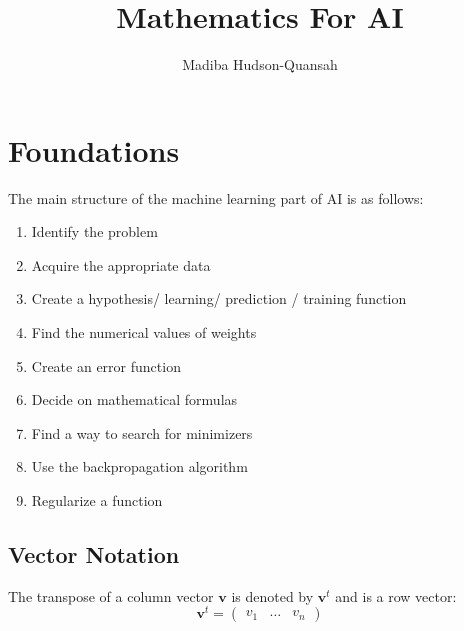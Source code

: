 \documentclass[12pt letter]{report}
\title{\Huge{Mathematics For AI}}
\author{\huge{Madiba Hudson-Quansah}}
\date{}
\begin{document}
\maketitle
\newpage
{}
\tableofcontents
\pagebreak

\chapter{Foundations}

The main structure of the machine learning part of AI is as follows:
\begin{enumerate}
  \item Identify the problem
  \item Acquire the appropriate data
  \item Create a hypothesis/ learning/ prediction / training function
  \item Find the numerical values of weights
  \item Create an error function
  \item Decide on mathematical formulas
  \item Find a way to search for minimizers
  \item Use the backpropagation algorithm
  \item Regularize a function
\end{enumerate}

\section{Vector Notation}


The transpose of a column vector $\mathbf{v}$ is denoted by $\mathbf{v}^t$ and is a row vector:
\[
  \mathbf{v}^t = \begin{pmatrix} v_1 & \ldots & v_n \end{pmatrix}
\]
\end{document}
